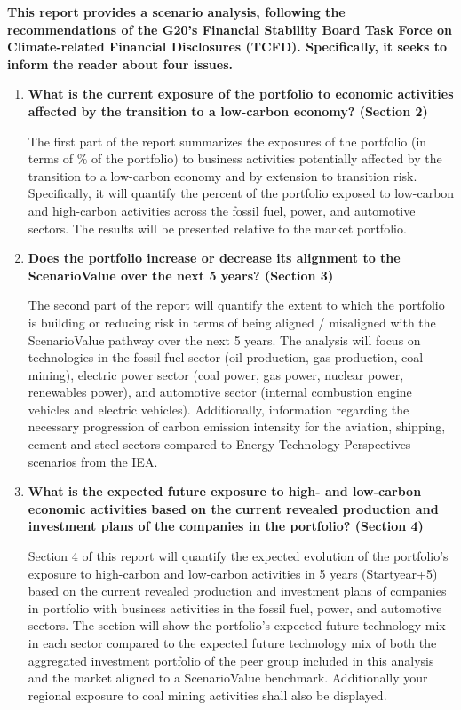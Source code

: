 \documentclass[10pt,table,a4]{article}\usepackage[]{graphicx}\usepackage[]{color}
\begin{document}
	\begin{multicols}{2}
		
		\textbf{This report provides a scenario analysis, following the recommendations of the G20's Financial Stability Board Task Force on Climate-related Financial Disclosures (TCFD). Specifically, it seeks to inform the reader about four issues.}
		
		\begin{enumerate}
			\item{\textbf{What is the current exposure of the portfolio to economic activities affected by the transition to a low-carbon economy? (Section 2) }
			}
			
			The first part of the report summarizes the exposures of the portfolio (in terms of \% of the portfolio) to business activities potentially affected by the transition to a low-carbon economy and by extension to transition risk. Specifically, it will quantify the percent of the portfolio exposed to low-carbon and high-carbon activities across the fossil fuel, power, and automotive sectors. The results will be presented relative to the market portfolio.  
			\item{\textbf{Does the portfolio increase or decrease its alignment to the ScenarioValue over the next 5 years? (Section 3)}
			}
			
			The second part of the report will quantify the extent to which the portfolio is building or reducing risk in terms of being aligned / misaligned with the ScenarioValue pathway over the next 5 years. The analysis will focus on technologies in the fossil fuel sector (oil production, gas production, coal mining), electric power sector (coal power, gas power, nuclear power, renewables power), and automotive sector (internal combustion engine vehicles and electric vehicles). Additionally, information regarding the necessary progression of carbon emission intensity for the aviation, shipping, cement and steel sectors compared to Energy Technology Perspectives scenarios from the IEA. 
			
			\item{\textbf{What is the expected future exposure to high- and low-carbon economic activities based on the current revealed production and investment plans of the companies in the portfolio? (Section 4)}
			}
			
			Section 4 of this report will quantify the expected evolution of the portfolio's exposure to high-carbon and low-carbon activities in 5 years (Startyear+5) based on the current revealed production and investment plans of companies in portfolio with business activities in the fossil fuel, power, and automotive sectors. The section will show the portfolio's expected future technology mix in each sector compared to the expected future technology mix of both the aggregated investment portfolio of the peer group included in this analysis and the market aligned to a ScenarioValue benchmark. Additionally your regional exposure to coal mining activities shall also be displayed. 
			

\end{enumerate}
\end{multicols}
\end{document}
